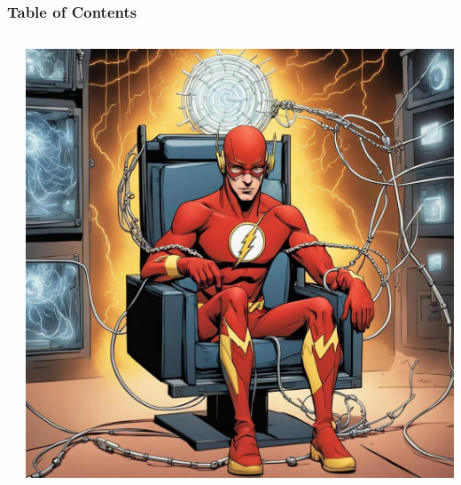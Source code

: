 \documentclass[
	11pt, %
]{beamer}
\begin{document}
\begin{frame}
	\frametitle{Table of Contents} %

	\begin{columns}
		\begin{column}{0.5\textwidth}
			\tableofcontents %
		\end{column}
		\begin{column}{0.5\textwidth}
            \centering
            \includegraphics[width=\linewidth]{table.jpg}
        \end{column}
	\end{columns}
	
\end{frame}

\end{document}
